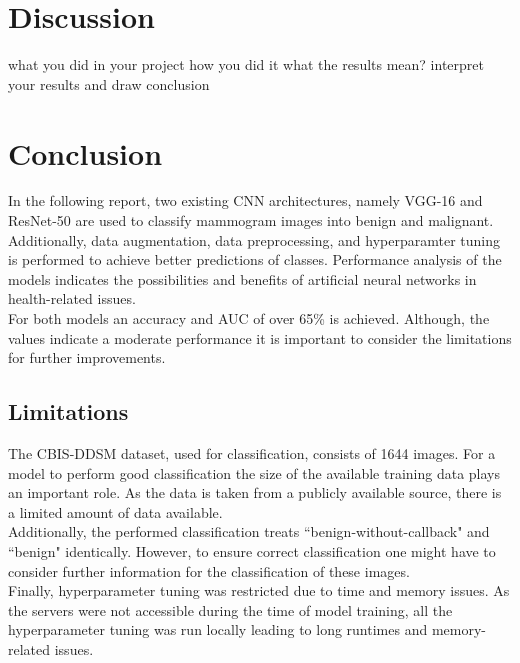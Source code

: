 \documentclass[sn-mathphys,Numbered]{sn-jnl}%
\theoremstyle{thmstyleone}%
\theoremstyle{thmstyletwo}%
\theoremstyle{thmstylethree}%
\begin{document}
\section{Discussion}\label{Discussion}
what you did in your project
how you did it
what the results mean?
interpret your results and draw conclusion

\section{Conclusion}\label{conclusion}
In the following report, two existing CNN architectures, namely VGG-16 and ResNet-50 are used to classify mammogram images into benign and malignant.\\
Additionally, data augmentation, data preprocessing, and hyperparamter tuning is performed to achieve better predictions of classes.
Performance analysis of the models indicates the possibilities and benefits of artificial neural networks in health-related issues. \\
For both models an accuracy and AUC of over 65\% is achieved.
Although, the values indicate a moderate performance it is important to consider the limitations for further improvements.
\subsection{Limitations}\label{limitation}
The CBIS-DDSM dataset, used for classification, consists of 1644 images. For a model to perform good classification the size of the available training data plays an important role. As the data is taken from a publicly available source, there is a limited amount of data available. \\
Additionally, the performed classification treats ``benign-without-callback"  and ``benign" identically. However, to ensure correct classification one might have to consider further information for the classification of these images.\\
Finally, hyperparameter tuning was restricted due to time and memory issues. As the servers were not accessible during the time of model training, all the hyperparameter tuning was run locally leading to long runtimes and memory-related issues. 




\end{document}
